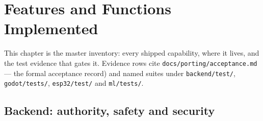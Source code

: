 \chapter{Features and Functions Implemented}\label{cha:features}

This chapter is the master inventory: every shipped capability, where it
lives, and the test evidence that gates it. Evidence rows cite
\texttt{docs/porting/acceptance.md} --- the formal acceptance
record) and named suites under \texttt{backend/test/},
\texttt{godot/tests/}, \texttt{esp32/test/} and \texttt{ml/tests/}.

\section{Backend: authority, safety and security}

